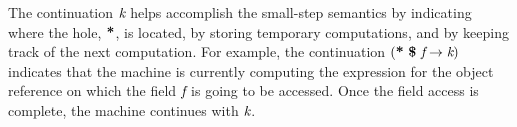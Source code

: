 The continuation $\emph{k}$ helps accomplish the small-step semantics
by indicating where the hole, $\textbf{*}$, is located, by storing
temporary computations, and by keeping track of the next
computation. For example, the continuation
$\lp\cfgt{*}\ \cfgt{\$}\ \cfgnt{f} \rightarrow \cfgnt{k}\rp$ indicates
that the machine is currently computing the expression for the object
reference on which the field $\emph{f}$ is going to be accessed. Once
the field access is complete, the machine continues with $\emph{k}$.




